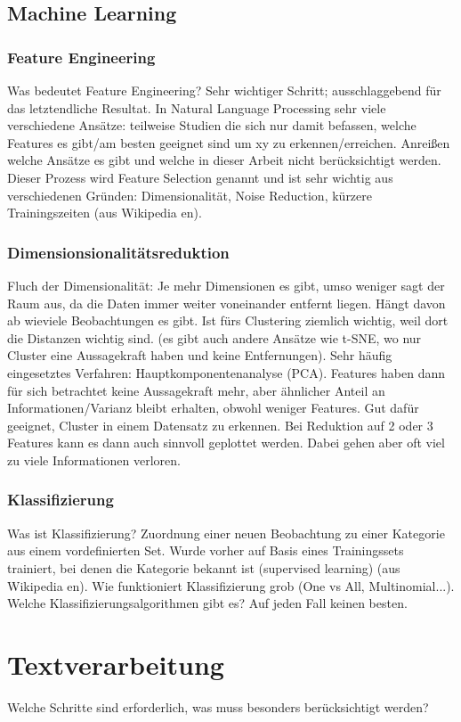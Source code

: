 \section{Machine Learning}
\subsection{Feature Engineering}
Was bedeutet Feature Engineering? Sehr wichtiger Schritt; ausschlaggebend für das letztendliche Resultat. In Natural Language Processing sehr viele verschiedene Ansätze: teilweise Studien die sich nur damit befassen, welche Features es gibt/am besten geeignet sind um xy zu erkennen/erreichen. Anreißen welche Ansätze es gibt und welche in dieser Arbeit nicht berücksichtigt werden. Dieser Prozess wird Feature Selection genannt und ist sehr wichtig aus verschiedenen Gründen: Dimensionalität, Noise Reduction, kürzere Trainingszeiten (aus Wikipedia en).
\subsection{Dimensionsionalitätsreduktion}
Fluch der Dimensionalität: Je mehr Dimensionen es gibt, umso weniger sagt der Raum aus, da die Daten immer weiter voneinander entfernt liegen. Hängt davon ab wieviele Beobachtungen es gibt. Ist fürs Clustering ziemlich wichtig, weil dort die Distanzen wichtig sind. (es gibt auch andere Ansätze wie t-SNE, wo nur Cluster eine Aussagekraft haben und keine Entfernungen). Sehr häufig eingesetztes Verfahren: Hauptkomponentenanalyse (PCA). Features haben dann für sich betrachtet keine Aussagekraft mehr, aber ähnlicher Anteil an Informationen/Varianz bleibt erhalten, obwohl weniger Features. Gut dafür geeignet, Cluster in einem Datensatz zu erkennen. Bei Reduktion auf 2 oder 3 Features kann es dann auch sinnvoll geplottet werden. Dabei gehen aber oft viel zu viele Informationen verloren.
\subsection{Klassifizierung}
Was ist Klassifizierung? Zuordnung einer neuen Beobachtung zu einer Kategorie aus einem vordefinierten Set. Wurde vorher auf Basis eines Trainingssets trainiert, bei denen die Kategorie bekannt ist (supervised learning) (aus Wikipedia en). Wie funktioniert Klassifizierung grob (One vs All, Multinomial...). Welche Klassifizierungsalgorithmen gibt es? Auf jeden Fall keinen besten.

\chapter{Textverarbeitung}
Welche Schritte sind erforderlich, was muss besonders berücksichtigt werden?
